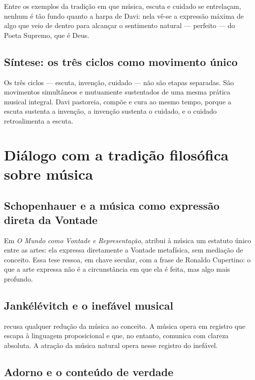 \documentclass[12pt,a4paper]{article}
\begin{document}
Entre os exemplos da tradição em que música, escuta e cuidado se entrelaçam, nenhum é tão fundo quanto a harpa de Davi: nela vê-se a expressão máxima de algo que veio de dentro para alcançar o sentimento natural --- perfeito --- do Poeta Supremo, que é Deus.

\subsection{Síntese: os três ciclos como movimento único}

Os três ciclos --- escuta, invenção, cuidado --- não são etapas separadas. São movimentos simultâneos e mutuamente sustentados de uma mesma prática musical integral. Davi pastoreia, compõe e cura ao mesmo tempo, porque a escuta sustenta a invenção, a invenção sustenta o cuidado, e o cuidado retroalimenta a escuta.

\section{Diálogo com a tradição filosófica sobre música}

\subsection{Schopenhauer e a música como expressão direta da Vontade}

Em \textit{O Mundo como Vontade e Representação}, \citet{Schopenhauer2005} atribui à música um estatuto único entre as artes: ela expressa diretamente a Vontade metafísica, sem mediação de conceito. Essa tese ressoa, em chave secular, com a frase de Ronaldo Cupertino: o que a arte expressa não é a circunstância em que ela é feita, mas algo mais profundo.

\subsection{Jankélévitch e o inefável musical}

\citet{Jankelevitch1983} recusa qualquer redução da música ao conceito. A música opera em registro que escapa à linguagem proposicional e que, no entanto, comunica com clareza absoluta. A atração da música natural opera nesse registro do inefável.

\subsection{Adorno e o conteúdo de verdade}
\end{document}
